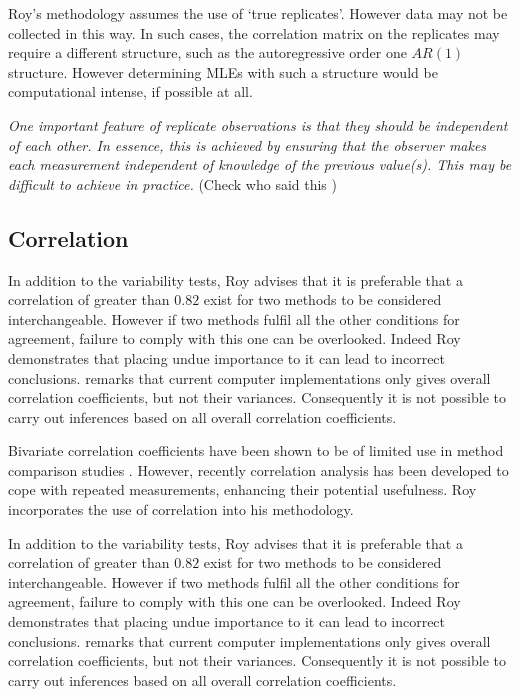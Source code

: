 \documentclass[12pt, a4paper]{report}
\theoremstyle{plain}
\theoremstyle{definition}
\theoremstyle{remark}
\begin{document}
Roy's methodology assumes the use of `true replicates'. However data may not be collected in this way. In such cases, the correlation matrix on the replicates may require a different structure, such as the autoregressive order one $AR(1)$ structure. However determining MLEs with such a structure would be computational intense, if possible at all.


\bigskip

\emph{
	One important feature of replicate observations is that they should be independent
	of each other. In essence, this is achieved by ensuring that the observer makes each
	measurement independent of knowledge of the previous value(s). This may be difficult
	to achieve in practice.} (Check who said this
)

\subsection{Correlation}
In addition to the variability tests, Roy advises that it is preferable that a correlation of greater than $0.82$ exist for two methods to be considered interchangeable. However if two methods fulfil all the other conditions for agreement, failure to comply with this one can be overlooked. Indeed Roy demonstrates that placing undue importance to it can lead to incorrect conclusions. \citet{roy} remarks that current computer implementations only gives overall correlation coefficients, but not their variances. Consequently it is not possible to carry out inferences based on all overall correlation coefficients.





	
	Bivariate correlation coefficients have been shown to be of
	limited use in method comparison studies \citep{BA86}. However,
	recently correlation analysis has been developed to cope with
	repeated measurements, enhancing their potential usefulness. Roy
	incorporates the use of correlation into his methodology.
	
	In addition to the variability tests, Roy advises that it is preferable that a correlation of greater than $0.82$ exist for two methods to be considered interchangeable. However if two methods fulfil all the other conditions for agreement, failure to comply with this one can be overlooked. Indeed Roy demonstrates that placing undue importance to it can lead to incorrect conclusions. \citet{ARoy2009} remarks that current computer implementations only gives overall correlation coefficients, but not their variances. Consequently it is not possible to carry out inferences based on all overall correlation coefficients.
	
\end{document}
